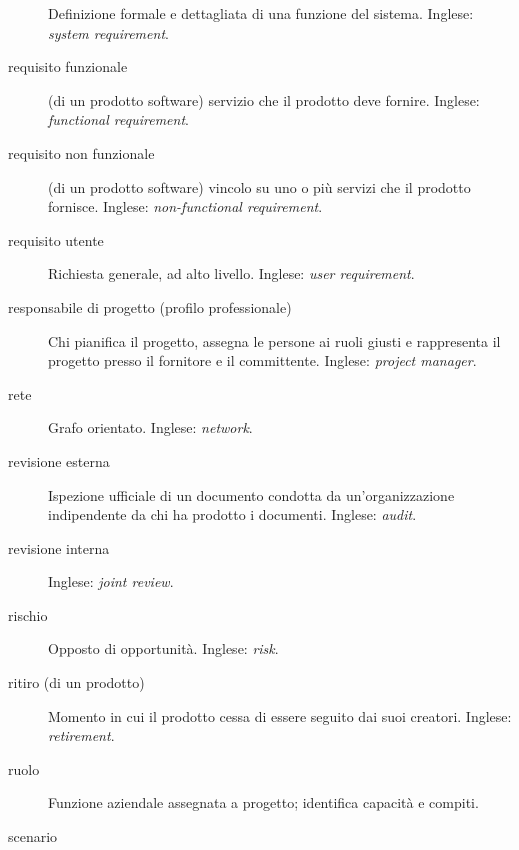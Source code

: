 \documentclass[a4paper]{article}
\begin{document}
\begin{description}
			Definizione formale e dettagliata di una funzione del sistema. Inglese: \emph{system requirement}.
			
	\item[requisito funzionale] 

			(di un prodotto software) servizio che il prodotto deve fornire. Inglese: \emph{functional requirement}.
			
	\item[requisito non funzionale] 

			(di un prodotto software) vincolo su uno o più servizi che il prodotto fornisce. Inglese: \emph{non-functional requirement}.
			
	\item[requisito utente] 

			Richiesta generale, ad alto livello. Inglese: \emph{user requirement}.
			
	\item[responsabile di progetto (profilo professionale)] 

			Chi pianifica il progetto, assegna le persone ai ruoli giusti e rappresenta il progetto presso il fornitore e il committente. Inglese: \emph{project manager}.
			
	\item[rete] 

			Grafo orientato. Inglese: \emph{network}.
			
	\item[revisione esterna] 

			Ispezione ufficiale di un documento condotta da un'organizzazione indipendente da chi ha prodotto i documenti. Inglese: \emph{audit}.
			
	\item[revisione interna] 

			 Inglese: \emph{joint review}.
			
	\item[rischio] 

			Opposto di opportunità. Inglese: \emph{risk}.
			
	\item[ritiro (di un prodotto)] 

			Momento in cui il prodotto cessa di essere seguito dai suoi creatori. Inglese: \emph{retirement}.
			
	\item[ruolo] 

			Funzione aziendale assegnata a progetto; identifica capacità e compiti.
			
	\item[scenario] 


\end{description}
\end{document}
